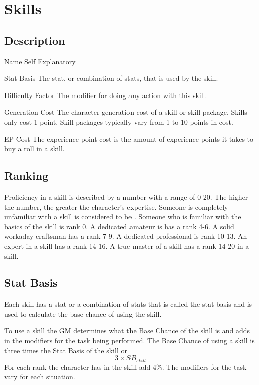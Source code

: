 \section{Skills}
\subsection{Description}

\begin{relate}
	\item[Name] 
	Self Explanatory
	\item[Stat Basis] 
	The stat, or combination of stats, that is used by the skill. 
	\item[Difficulty Factor] 
	The modifier for doing any action with this skill.
	\item[Generation Cost]
	The character generation cost of a skill or skill package. Skills
	only cost 1 point. Skill packages typically vary from 1
	to 10 points in cost.
	\item[EP Cost] 
	The experience point cost is the amount of experience points it takes to
	buy a roll in a skill. 
\end{relate}

\subsection{Ranking}

Proficiency in a skill is described by a number with a range of 0-20.
The higher the number, the greater the character's expertise. Someone
is completely unfamiliar with a skill is considered to be
. Someone who is familiar with the basics of
the skill is rank 0. A dedicated amateur is has a rank 4-6. A
solid workaday craftsman has a rank 7-9. A dedicated professional is rank 
10-13. An expert in a skill has a rank 14-16. A true master of a skill has 
a rank 14-20 in a skill. 

\subsection{Stat Basis}

Each skill has a stat or a combination of stats that is called the 
stat basis and is used to calculate the base chance of using the 
skill. 

To use a skill the GM determines what the Base Chance of the skill is 
and adds in the modifiers for the task being performed.
The Base Chance of using a skill is three times the Stat Basis of the skill
or \[ 3 \times SB_{skill} \] For each rank the character has in the skill add 4\%.
The modifiers for the task vary for each situation.

